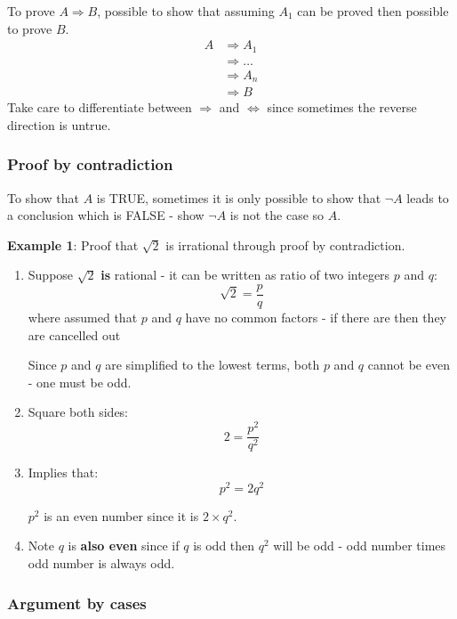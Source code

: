 \documentclass[10pt,a4paper]{article}
\begin{document}
To prove $A\Rightarrow B$, possible to show that assuming $A_1$ can be proved then possible to prove
$B$.
\begin{align*}
    A &\Rightarrow A_1 \\
    &\Rightarrow \dots \\
    &\Rightarrow A_n \\
    &\Rightarrow B
\end{align*}
Take care to differentiate between $\Rightarrow$ and $\Longleftrightarrow$ since sometimes the
reverse direction is untrue.

\subsubsection{Proof by contradiction}

To show that $A$ is TRUE, sometimes it is only possible to show that $\neg A$ leads to a conclusion
which is FALSE - show $\neg A$ is not the case so $A$.

\textbf{Example 1}: Proof that $\sqrt{2}$ is irrational through proof by contradiction.
\begin{enumerate}
    \item Suppose $\sqrt{2}$ \textbf{is} rational - it can be written as ratio of two integers $p$
    and $q$:
    $$
        \sqrt{2} = \frac{p}{q}
    $$
    where assumed that $p$ and $q$ have no common factors - if there are then they are cancelled out

    Since $p$ and $q$ are simplified to the lowest terms, both $p$ and $q$ cannot be even - one
    must be odd.
    
    \item Square both sides:
    $$
        2 = \frac{p^2}{q^2}
    $$

    \item Implies that:
    $$
        p^2 = 2q^2
    $$

    $p^2$ is an even number since it is $2 \times q^2$. 

    \item Note $q$ is \textbf{also even} since if $q$ is odd then $q^2$ will be odd - odd number
    times odd number is always odd.
\end{enumerate}

\subsubsection{Argument by cases}
\end{document}
